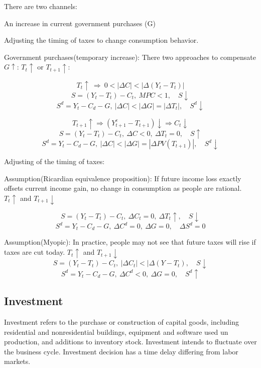 \documentclass[10pt, a4paper]{article}
\begin{document}
                    There are two channels: 
                    
                    \quad An increase in current government purchases (G) 

                    \quad Adjusting the timing of taxes to change consumption behavior.

                    Government purchases(temporary increase): There two approaches to compensate $G \uparrow$: $T_t \uparrow$ or $T_{t+1} \uparrow$:
                    
                    $$T_t\uparrow \  \Rightarrow \  0 < |\Delta C| < |\Delta (Y_t - T_t)|$$
                        $$S = (Y_t - T_t) - C_t,\ MPC < 1, \quad  S\downarrow$$
                        $$S^d = Y_t - C_d - G,\ |\Delta C| < |\Delta G| = |\Delta T_t|,\quad S^d\downarrow$$


                    $$T_{t+1}\uparrow \Rightarrow (Y_{t+1}^e - T_{t+1})\downarrow \Rightarrow C_t \downarrow$$
                    $$S = (Y_t - T_t) - C_t,\ \Delta C < 0,\ \Delta T_t = 0, \quad   S\uparrow$$
                    $$S^d = Y_t - C_d - G,\ |\Delta C| < |\Delta G| = |\Delta PV(T_{t+1})|,\quad S^d\downarrow$$

                    Adjusting of the timing of taxes: 

                    \quad Assumption(Ricardian equivalence proposition): If future income loss exactly offsets current income gain, no change in consumption as people are rational. $T_t \uparrow$ and $T_{t+1} \downarrow$ 

                    $$S = (Y_t - T_t) - C_t,\ \Delta C_t = 0,\ \Delta T_t \uparrow,\quad  S \downarrow$$
                    $$S^d = Y_t - C_d - G,\ \Delta C^d = 0,\ \Delta G = 0, \quad \Delta S^d = 0$$

                    \quad Assumption(Myopic): In practice, people may  not see that future taxes will rise if taxes are cut today. $T_t \uparrow$ and $T_{t+1} \downarrow$ 
                    $$S = (Y_t - T_t) - C_t,\ |\Delta C_t| < |\Delta (Y - T_t),\quad S\downarrow$$
                    $$S^d = Y_t - C_d - G,\ \Delta C^d < 0,\ \Delta G = 0, \quad S^d\uparrow$$

        \subsection{Investment}
            Investment refers to the purchase or construction of capital goods, including residential and nonresidential buildings, equipment and software used un production, and additions to inventory stock. Investment intends to fluctuate over the business cycle. Investment decision has a time delay differing from labor markets. 
\end{document}

